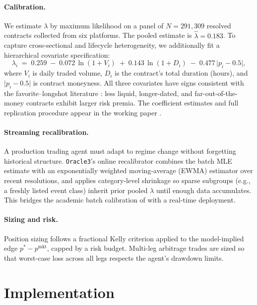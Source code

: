 \documentclass[11pt,a4paper]{article}
\begin{document}
\paragraph{Calibration.}
We estimate $\lambda$ by maximum likelihood on a panel of $N = 291{,}309$
resolved contracts collected from six platforms. The pooled estimate is
$\hat\lambda = 0.183$. To capture cross-sectional and lifecycle heterogeneity,
we additionally fit a hierarchical covariate specification:
%
\begin{equation}
  \lambda_i \;=\; 0.259 \;-\; 0.072\,\ln(1+V_i) \;+\; 0.143\,\ln(1+D_i)
                    \;-\; 0.477\,\lvert p_i - 0.5 \rvert,
  \label{eq:lambda}
\end{equation}
%
where $V_i$ is daily traded volume, $D_i$ is the contract's total duration
(hours), and $\lvert p_i - 0.5 \rvert$ is contract moneyness. All three covariates have
signs consistent with the favorite--longshot literature
\citep{thaler:1988,snowberg:2010,wolfers:2004,manski:2006,ottaviani:2007}: less
liquid, longer-dated, and far-out-of-the-money contracts exhibit larger risk
premia. The coefficient estimates and full replication procedure appear in the
working paper \citep{yang:2026}.

\paragraph{Streaming recalibration.}
A production trading agent must adapt to regime change without forgetting
historical structure. \texttt{Oracle3}'s online recalibrator combines the
batch MLE estimate with an exponentially weighted moving-average (EWMA)
estimator over recent resolutions, and applies category-level shrinkage so
sparse subgroups (e.g., a freshly listed event class) inherit prior pooled
$\lambda$ until enough data accumulates. This bridges the academic batch
calibration of \citet{yang:2026} with a real-time deployment.

\paragraph{Sizing and risk.}
Position sizing follows a fractional Kelly criterion \citep{kelly:1956}
applied to the model-implied edge $p^{*} - p^{\mathrm{mkt}}$, capped by a risk
budget. Multi-leg arbitrage trades are sized so that worst-case loss across
all legs respects the agent's drawdown limits.

\section{Implementation}
\label{sec:impl}
\end{document}
